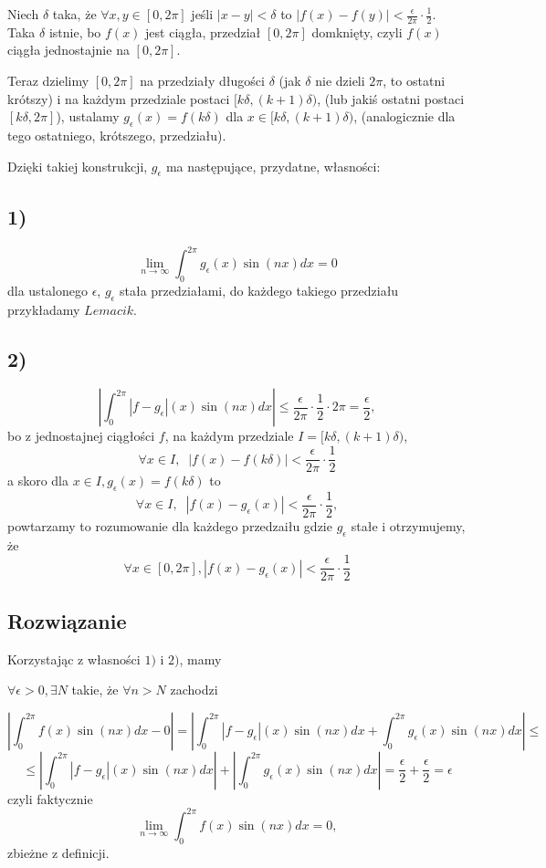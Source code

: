 \documentclass{article}
\begin{document}
Niech $\delta$ taka, że $\forall x,y \in [0,2\pi]$ jeśli $|x-y| < \delta$ to $|f(x) - f(y)| < \frac{\epsilon}{2\pi} \cdot \frac{1}{2}$. Taka $\delta$ istnie, bo $f(x)$ jest ciągła, przedział
$[0, 2\pi]$ domknięty, czyli $f(x)$ ciągła jednostajnie na $[0, 2\pi]$.

Teraz dzielimy $[0, 2\pi]$ na przedziały długości $\delta$ (jak $\delta$ nie dzieli $2\pi$, to ostatni krótszy) i na każdym przedziale postaci $[k\delta, (k+1)\delta)$, (lub jakiś ostatni postaci $[k\delta, 2\pi]$), ustalamy $g_{\epsilon}(x) = f(k\delta)$ dla $x\in [k\delta, (k+1)\delta)$, (analogicznie dla tego ostatniego, krótszego, przedziału).

Dzięki takiej konstrukcji, $g_{\epsilon}$ ma następujące, przydatne, własności:

\subsection*{1)}

$$ \lim_{n\to\infty}\int_0^{2\pi}g_{\epsilon}(x)\sin(nx)dx = 0$$
dla ustalonego $\epsilon$, $g_{\epsilon}$ stała przedziałami, do każdego takiego przedziału przykładamy $Lemacik$.
\subsection*{2)}
$$ \left| \int_0^{2\pi}|f-g_{\epsilon}|(x)\sin(nx)dx \right| \le \frac{\epsilon}{2\pi}\cdot\frac{1}{2} \cdot2\pi = \frac{\epsilon}{2},$$
bo z jednostajnej ciągłości $f$, na każdym przedziale $I=[k\delta, (k+1)\delta)$, 
$$\forall x \in I,\;\; |f(x)-f(k\delta)| < \frac{\epsilon}{2\pi}\cdot\frac{1}{2}$$ 
a skoro dla $x\in I, g_{\epsilon}(x) = f(k\delta)$ to
$$\forall x \in I, \;\; |f(x) - g_{\epsilon}(x)| < \frac{\epsilon}{2\pi}\cdot\frac{1}{2},$$
powtarzamy to rozumowanie dla każdego przedzaiłu gdzie $g_{\epsilon}$ stałe i otrzymujemy, że
$$ \forall x \in [0, 2\pi], |f(x)-g_{\epsilon}(x)| < \frac{\epsilon}{2\pi}\cdot\frac{1}{2}$$

\subsection*{Rozwiązanie}
Korzystając z własności $1)$ i $2)$, mamy \newline

$\forall \epsilon > 0, \exists N$ takie, że  $\forall n > N$ zachodzi

$$ \left| \int_0^{2\pi}f(x)\sin(nx)dx - 0 \right| =
\left| \int_0^{2\pi} |f-g_{\epsilon}|(x)\sin(nx)dx + \int_0^{2\pi}g_{\epsilon}(x)\sin(nx)dx \right|
\le $$ 
$$ \le \left| \int_0^{2\pi} |f-g_{\epsilon}|(x)\sin(nx)dx \right| + \left| \int_0^{2\pi}g_{\epsilon}(x)\sin(nx)dx \right| = \frac{\epsilon}{2} + \frac{\epsilon}{2} = \epsilon $$
czyli faktycznie
$$\lim_{n\to\infty}\int_0^{2\pi}f(x)\sin(nx)dx = 0,$$
zbieżne z definicji.
\end{document}
